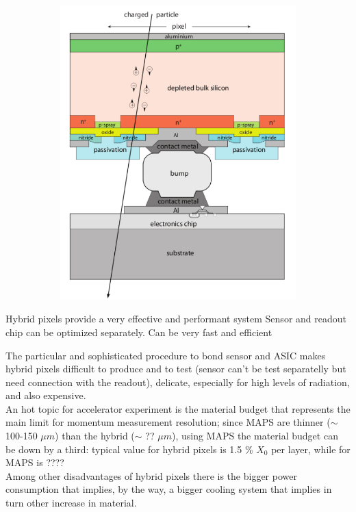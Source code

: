 \begin{figure}
\begin{subfigure}{.5\textwidth}
      \includegraphics[width=.8\linewidth]{figures/Pixel_detectors/hybrid_scheme.png}
      \caption{}
      \label{fig:hybrid_scheme}
      \end{subfigure}
   \end{figure}
   Hybrid pixels provide a very effective and performant system
   Sensor and readout chip can be optimized separately.
   Can be very fast and efficient
   
   The particular and sophisticated procedure to bond sensor and ASIC makes hybrid pixels difficult to produce and to test (sensor can't be test separatelly but need connection with the readout), delicate, especially for high levels of radiation, and also expensive. \\

   An hot topic for accelerator experiment is the material budget that represents the main limit for momentum measurement resolution; since MAPS are thinner ($\sim$ 100-150 $\mu m$) than the hybrid ($\sim$ ?? $\mu m$), using MAPS the material budget can be down by a third: typical value for hybrid pixels is 1.5 \% $X_0$ per layer, while for MAPS is ???? \\
   Among other disadvantages of hybrid pixels there is the bigger power consumption that implies, by the way, a bigger cooling system that implies in turn other increase in material.\\

